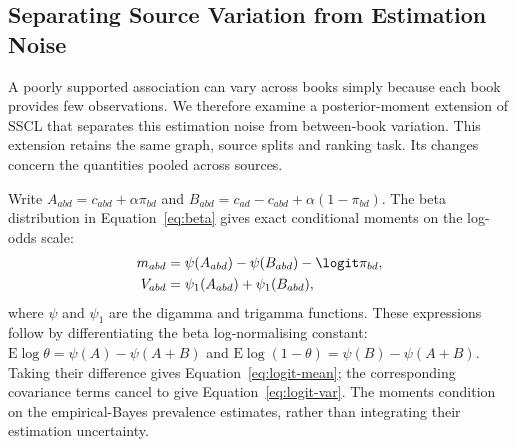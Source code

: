 \subsection{Separating Source Variation from Estimation Noise}
\label{sec:posterior-extension}

A poorly supported association can vary across books simply because each book provides few observations. We therefore examine a posterior-moment extension of SSCL that separates this estimation noise from between-book variation. This extension retains the same graph, source splits and ranking task. Its changes concern the quantities pooled across sources.

Write $A_{abd}=c_{abd}+\alpha\pi_{bd}$ and $B_{abd}=c_{ad}-c_{abd}+\alpha(1-\pi_{bd})$. The beta distribution in Equation~\eqref{eq:beta} gives exact conditional moments on the log-odds scale:
\begin{align}
 m_{abd}&=\psi(A_{abd})-\psi(B_{abd})-\logit\pi_{bd},\label{eq:logit-mean}\\
 V_{abd}&=\psi_1(A_{abd})+\psi_1(B_{abd}),\label{eq:logit-var}
\end{align}
where $\psi$ and $\psi_1$ are the digamma and trigamma functions. These expressions follow by differentiating the beta log-normalising constant: $\mathrm E\log\theta=\psi(A)-\psi(A+B)$ and $\mathrm E\log(1-\theta)=\psi(B)-\psi(A+B)$. Taking their difference gives Equation~\eqref{eq:logit-mean}; the corresponding covariance terms cancel to give Equation~\eqref{eq:logit-var}. The moments condition on the empirical-Bayes prevalence estimates, rather than integrating their estimation uncertainty.

